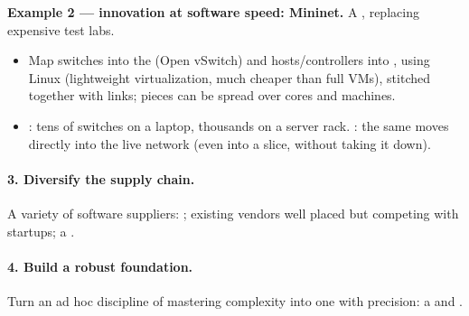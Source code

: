 \textbf{Example 2 --- innovation at software speed: Mininet.} A , replacing expensive test labs.
\begin{itemize}
\item Map switches into the  (Open vSwitch) and hosts/controllers into , using Linux  (lightweight virtualization, much cheaper than full VMs), stitched together with  links; pieces can be spread over cores and machines.
\item {}: tens of switches on a laptop, thousands on a server rack. : the same  moves directly into the live network (even into a slice, without taking it down).
\end{itemize}
\paragraph{3. Diversify the supply chain.} A variety of software suppliers: ; existing vendors well placed but competing with startups; a .
\paragraph{4. Build a robust foundation.} Turn an ad hoc discipline of mastering complexity into one with precision: a  and .

